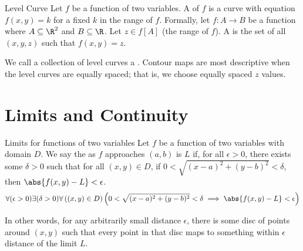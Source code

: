 \begin{dfnbox}{Level Curve}{}
    Let $f$ be a function of two variables. A  of $f$ is a curve with equation $f(x,y) = k$ for a fixed $k$ in the range of $f$.
    \tcblower
    Formally, let $f : A \to B$ be a function where $A \subseteq \R^2$ and $B \subseteq \R$. Let $z \in f[A]$ (the range of $f$). A  is the set of all $(x,y,z)$ such that $f(x,y) = z$.
\end{dfnbox}

We call a collection of level curves a . Contour maps are most descriptive when the level curves are equally spaced; that is, we choose equally spaced $z$ values.

\section{Limits and Continuity}

\begin{dfnbox}{Limits for functions of two variables}{}
    Let $f$ be a function of two variables with domain $D$. We say the  as $f$ approaches $(a,b)$ is $L$ if, for all $\epsilon > 0$, there exists some $\delta > 0$ such that for all $(x,y) \in D$, if $0 < \sqrt{(x-a)^2 + (y-b)^2} < \delta$, then $\abs{f(x,y) - L} < \epsilon$.
    \tcblower
    \[ \forall(\epsilon > 0) \exists(\delta > 0) \forall \left( (x,y) \in D \right) \left(0 < \sqrt{(x-a)^2 + (y-b)^2} < \delta \implies \abs{f(x,y) - L} < \epsilon\right) \]
\end{dfnbox}

In other words, for any arbitrarily small distance $\epsilon$, there is some disc of points around $(x,y)$ such that every point in that disc maps to something within $\epsilon$ distance of the limit $L$.

